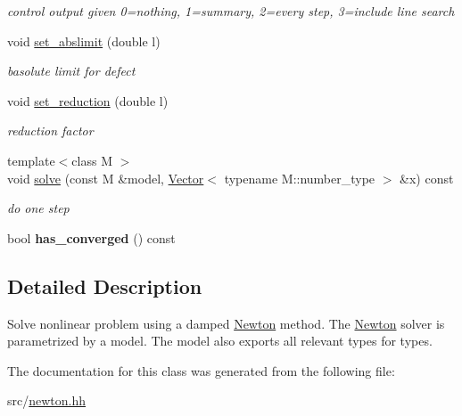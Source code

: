 \begin{DoxyCompactItemize}
\begin{DoxyCompactList}\small\item\em control output given 0=nothing, 1=summary, 2=every step, 3=include line search \item\end{DoxyCompactList}\item 
\hypertarget{classhdnum_1_1Newton_a4da35666f8794067a3ca84f1fea895f0}{
void \hyperlink{classhdnum_1_1Newton_a4da35666f8794067a3ca84f1fea895f0}{set\_\-abslimit} (double l)}
\label{classhdnum_1_1Newton_a4da35666f8794067a3ca84f1fea895f0}

\begin{DoxyCompactList}\small\item\em basolute limit for defect \item\end{DoxyCompactList}\item 
\hypertarget{classhdnum_1_1Newton_ac28cbdace309a823ddc62b6ed929dadc}{
void \hyperlink{classhdnum_1_1Newton_ac28cbdace309a823ddc62b6ed929dadc}{set\_\-reduction} (double l)}
\label{classhdnum_1_1Newton_ac28cbdace309a823ddc62b6ed929dadc}

\begin{DoxyCompactList}\small\item\em reduction factor \item\end{DoxyCompactList}\item 
\hypertarget{classhdnum_1_1Newton_ab4f4df87fbf938cf186530408bfab2b3}{
{\footnotesize template$<$class M $>$ }\\void \hyperlink{classhdnum_1_1Newton_ab4f4df87fbf938cf186530408bfab2b3}{solve} (const M \&model, \hyperlink{classhdnum_1_1Vector}{Vector}$<$ typename M::number\_\-type $>$ \&x) const }
\label{classhdnum_1_1Newton_ab4f4df87fbf938cf186530408bfab2b3}

\begin{DoxyCompactList}\small\item\em do one step \item\end{DoxyCompactList}\item 
\hypertarget{classhdnum_1_1Newton_a2f133f417aa9b71ad92d72d6935401fa}{
bool {\bfseries has\_\-converged} () const }
\label{classhdnum_1_1Newton_a2f133f417aa9b71ad92d72d6935401fa}

\end{DoxyCompactItemize}


\subsection{Detailed Description}
Solve nonlinear problem using a damped \hyperlink{classhdnum_1_1Newton}{Newton} method. The \hyperlink{classhdnum_1_1Newton}{Newton} solver is parametrized by a model. The model also exports all relevant types for types. 

The documentation for this class was generated from the following file:\begin{DoxyCompactItemize}
\item 
src/\hyperlink{newton_8hh}{newton.hh}\end{DoxyCompactItemize}
